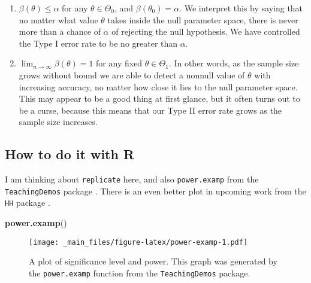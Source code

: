 \documentclass[]{book}
\newenvironment{Shaded}{\begin{snugshade}}{\end{snugshade}}
\newcommand{\KeywordTok}[1]{\textcolor[rgb]{0.13,0.29,0.53}{\textbf{{#1}}}}
\newcommand{\NormalTok}[1]{{#1}}
\providecommand{\tightlist}{%
  \setlength{\itemsep}{0pt}\setlength{\parskip}{0pt}}
\numberwithin{equation}{chapter}
\numberwithin{figure}{chapter}
\theoremstyle{plain}
\theoremstyle{definition}
\theoremstyle{remark}
\theoremstyle{definition}
\theoremstyle{definition}
\theoremstyle{remark}
\begin{document}
\begin{enumerate}
\def\labelenumi{\arabic{enumi}.}
\tightlist
\item
  \(\beta(\theta)\leq\alpha\) for any \(\theta\in\Theta_{0}\), and
  \(\beta(\theta_{0})=\alpha\). We interpret this by saying that no
  matter what value \(\theta\) takes inside the null parameter space,
  there is never more than a chance of \(\alpha\) of rejecting the null
  hypothesis. We have controlled the Type I error rate to be no greater
  than \(\alpha\).
\item
  \(\lim_{n\to\infty}\beta(\theta)=1\) for any fixed
  \(\theta\in\Theta_{1}\). In other words, as the sample size grows
  without bound we are able to detect a nonnull value of \(\theta\) with
  increasing accuracy, no matter how close it lies to the null parameter
  space. This may appear to be a good thing at first glance, but it
  often turns out to be a curse, because this means that our Type II
  error rate grows as the sample size increases.
\end{enumerate}

\subsection{How to do it with R}\label{how-to-do-it-with-r-47}

I am thinking about \texttt{replicate}
 here, and also \texttt{power.examp}
 from the \texttt{TeachingDemos}
package \autocite{TeachingDemos}. There is an even better plot in
upcoming work from the \texttt{HH} package \autocite{HH}.

\begin{Shaded}
\begin{Highlighting}[]
\KeywordTok{power.examp}\NormalTok{()}
\end{Highlighting}
\end{Shaded}

\begin{figure}[htbp]
\centering
\texttt{[image: \_main\_files/figure-latex/power-examp-1.pdf]}
\caption{\label{fig:power-examp}\small A plot of significance level and power.
This graph was generated by the \texttt{power.examp} function from the
\texttt{TeachingDemos} package.}
\end{figure}
\end{document}
